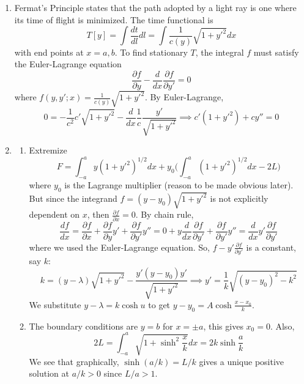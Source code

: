 \documentclass[a4paper]{article}
\begin{document}
\begin{ans}\leavevmode
\begin{enumerate}[label=(\alph*)]
\item Fermat's Principle states that the path adopted by a light ray is one where its time of flight is minimized. The time functional is
$$T[y]=\int\frac{dt}{dl}dl=\int\frac{1}{c(y)}\sqrt{1+y'^2}dx$$
with end points at $x=a,b$. To find stationary $T$, the integral $f$ must satisfy the Euler-Lagrange equation
$$\frac{\partial f}{\partial y}-\frac{d}{dx}\frac{\partial f}{\partial y'}=0$$
where $f(y,y';x)=\frac{1}{c(y)}\sqrt{1+y'^2}$. By Euler-Lagrange,
$$0=-\frac{1}{c^2}c'\sqrt{1+y'^2}-\frac{d}{dx}\frac{1}{c}\frac{y'}{\sqrt{1+y'^2}}\implies c'(1+y'^2)+cy''=0$$
\item
\begin{enumerate}[label=(\roman*)]
\item Extremize
$$F=\int_{-a}^ay(1+y'^2)^{1/2}dx+y_0\bigg(\int_{-a}^a(1+y'^2)^{1/2}dx-2L\bigg)$$
where $y_0$ is the Lagrange multiplier (reason to be made obvious later). But since the integrand $f=(y-y_0)\sqrt{1+y'^2}$ is not explicitly dependent on $x$, then $\frac{\partial f}{\partial x}=0$. By chain rule,
$$\frac{df}{dx}=\frac{\partial f}{\partial x}+\frac{\partial f}{\partial y}y'+\frac{\partial f}{\partial y'}y''=0+y\frac{d}{dx}\frac{\partial f}{\partial y'}+\frac{\partial f}{\partial y'}y''=\frac{d}{dx}y'\frac{\partial f}{\partial y'}$$
where we used the Euler-Lagrange equation. So, $f-y'\frac{\partial f}{\partial y'}$ is a constant, say $k$:
$$k=(y-\lambda)\sqrt{1+y'^2}-\frac{y'(y-y_0)y'}{\sqrt{1+y'^2}}\implies y'=\frac{1}{k}\sqrt{(y-y_0)^2-k^2}$$
We substitute $y-\lambda=k\cosh u$ to get $y-y_0=A\cosh\frac{x-x_0}{k}$.
\item The boundary conditions are $y=b$ for $x=\pm a$, this gives $x_0=0$. Also,
$$2L=\int_{-a}^a\sqrt{1+\sinh^2\frac{x}{k}}dx=2k\sinh\frac{a}{k}$$
We see that graphically, $\sinh(a/k)=L/k$ gives a unique positive solution at $a/k>0$ since $L/a>1$.
\end{enumerate}
\end{enumerate}
\begin{center}
\end{center}
\end{ans}
\end{document}
